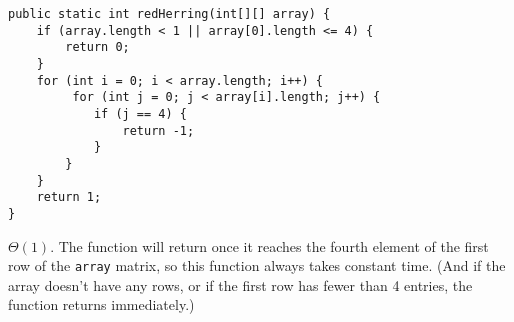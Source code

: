 \begin{blocksection}
\question

\begin{lstlisting}
public static int redHerring(int[][] array) {
    if (array.length < 1 || array[0].length <= 4) {
        return 0;
    }
    for (int i = 0; i < array.length; i++) {
         for (int j = 0; j < array[i].length; j++) {
            if (j == 4) {
                return -1;
            }
        }
    }
    return 1;
}
\end{lstlisting}

\begin{solution}
$\Theta(1)$. The function will return once it reaches the fourth element of the
first row of the \lstinline$array$ matrix, so this function always takes
constant time. (And if the array doesn't have any rows, or if the first row has
fewer than 4 entries, the function returns immediately.)
\end{solution}
\end{blocksection}
